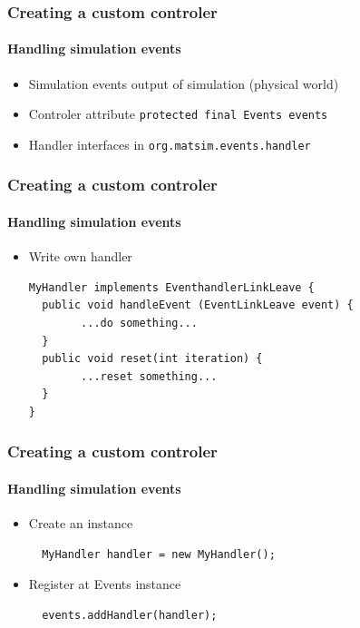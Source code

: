\begin{frame}[fragile]
\frametitle{Creating a custom controler}
\framesubtitle{Handling simulation events}
\begin{itemize}
  \item Simulation events output of simulation (physical world)
  \item Controler attribute \verb|protected final Events events|
  \item Handler interfaces in \verb|org.matsim.events.handler|
\end{itemize}

\end{frame}

\begin{frame}[fragile]
\frametitle{Creating a custom controler}
\framesubtitle{Handling simulation events}
\begin{itemize}
  \item Write own handler \\
  \begin{verbatim}
MyHandler implements EventhandlerLinkLeave {
  public void handleEvent (EventLinkLeave event) {
    	...do something...
  }
  public void reset(int iteration) {
    	...reset something...
  }
}\end{verbatim}
\end{itemize}

\end{frame}


\begin{frame}[fragile]
\frametitle{Creating a custom controler}
\framesubtitle{Handling simulation events}
\begin{itemize}
  \item Create an instance \\
  \begin{verbatim}
  MyHandler handler = new MyHandler();
  \end{verbatim}
  \item Register at Events instance \\
  \begin{verbatim}
  events.addHandler(handler);
  \end{verbatim}
 \end{itemize}
\end{frame}


